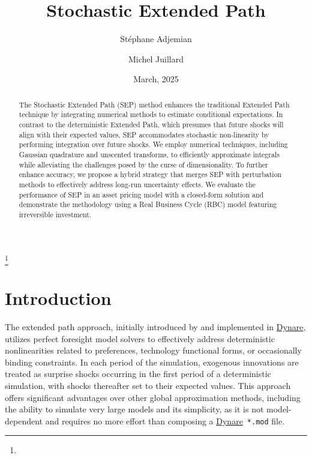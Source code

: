 \documentclass[a4paper,11pt]{amsart}
\newcommand{\Dynare}{\href{http://www.dynare.org}{Dynare}}
\begin{document}
\author[S. Adjemian]{Stéphane Adjemian}\address{Université du Mans and Dynare team}
\author[M. Juillard]{Michel Juillard}\address{Dynare team}


\title[Stochastic Extended Path]{Stochastic Extended Path}\thanks{}
\date{March, 2025}

\maketitle

\begin{abstract}
   The Stochastic Extended Path (SEP) method enhances the traditional
   Extended Path technique by integrating numerical methods to estimate
   conditional expectations. In contrast to the deterministic Extended
   Path, which presumes that future shocks will align with their
   expected values, SEP accommodates stochastic non-linearity by
   performing integration over future shocks. We employ numerical
   techniques, including Gaussian quadrature and unscented transforms,
   to efficiently approximate integrals while alleviating the
   challenges posed by the curse of dimensionality. To further enhance
   accuracy, we propose a hybrid strategy that merges SEP with
   perturbation methods to effectively address long-run uncertainty
   effects. We evaluate the performance of SEP in an asset pricing
   model with a closed-form solution and demonstrate the methodology
   using a Real Business Cycle (RBC) model featuring irreversible
   investment.
\end{abstract}

\section*{Introduction}

The extended path approach, initially introduced by
\textcite{FairTaylor1983} and implemented in \Dynare, utilizes perfect
foresight model solvers to effectively address deterministic
nonlinearities related to preferences, technology functional forms, or
occasionally binding constraints. In each period of the simulation,
exogenous innovations are treated as surprise shocks occurring in the
first period of a deterministic simulation, with shocks thereafter set
to their expected values. This approach offers significant advantages
over other global approximation methods, including the ability to
simulate very large models and its simplicity, as it is not
model-dependent and requires no more effort than composing a \Dynare\,
\verb+*.mod+ file.\newline
\end{document}
